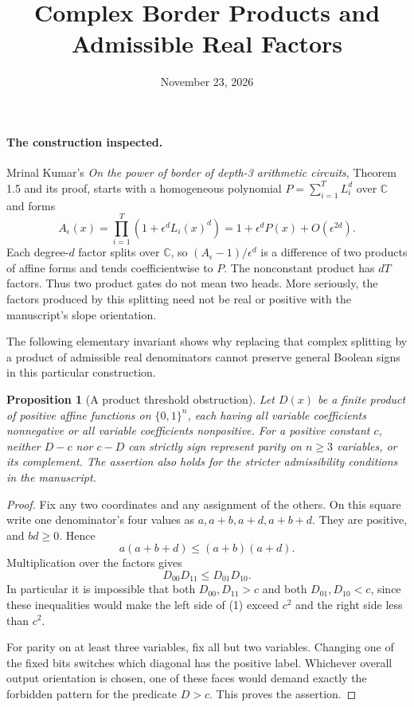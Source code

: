 \documentclass[11pt]{article}
\newtheorem{proposition}{Proposition}
\begin{document}
\title{Complex Border Products and Admissible Real Factors}
\author{}
\date{November 23, 2026}
\maketitle

\paragraph{The construction inspected.}
Mrinal Kumar's \emph{On the power of border of depth-3 arithmetic
circuits}, Theorem 1.5 and its proof, starts with a homogeneous
polynomial $P=\sum_{i=1}^T L_i^d$ over $\mathbb C$ and forms
\[
 A_\epsilon(x)=\prod_{i=1}^T(1+\epsilon^dL_i(x)^d)
                   =1+\epsilon^dP(x)+O(\epsilon^{2d}).
\]
Each degree-$d$ factor splits over $\mathbb C$, so
$(A_\epsilon-1)/\epsilon^d$ is a difference of two products of
affine forms and tends coefficientwise to $P$. The nonconstant
product has $dT$ factors. Thus two product gates do not mean two
heads. More seriously, the factors produced by this splitting need
not be real or positive with the manuscript's slope orientation.

The following elementary invariant shows why replacing that
complex splitting by a product of admissible real denominators
cannot preserve general Boolean signs in this particular construction.

\begin{proposition}[A product threshold obstruction]
Let $D(x)$ be a finite product of positive affine functions on
$\{0,1\}^n$, each having all variable coefficients nonnegative
or all variable coefficients nonpositive. For a positive constant
$c$, neither $D-c$ nor $c-D$ can strictly sign represent parity
on $n\ge3$ variables, or its complement.
The assertion also holds for the stricter admissibility conditions
in the manuscript.
\end{proposition}

\begin{proof}
Fix any two coordinates and any assignment of the others. On this
square write one denominator's four values as
$a,a+b,a+d,a+b+d$. They are positive, and $bd\ge0$. Hence
\[
                  a(a+b+d)\le(a+b)(a+d).
\]
Multiplication over the factors gives
\[
                          D_{00}D_{11}\le D_{01}D_{10}.
\tag{1}
\]
In particular it is impossible that both $D_{00},D_{11}>c$
and both $D_{01},D_{10}<c$, since these inequalities would make
the left side of (1) exceed $c^2$ and the right side less than $c^2$.

For parity on at least three variables, fix all but two variables.
Changing one of the fixed bits switches which diagonal has the
positive label. Whichever overall output orientation is chosen,
one of these faces would demand exactly the forbidden pattern
for the predicate $D>c$. This proves the assertion.
\end{proof}
\end{document}
